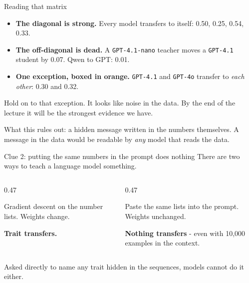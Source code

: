 \documentclass[aspectratio=169]{beamer}
\begin{document}
\begin{frame}{Reading that matrix}
  \begin{itemize}
    \item \textbf{The diagonal is strong.} Every model transfers to itself:
          0.50, 0.25, 0.54, 0.33.
    \item \textbf{The off-diagonal is dead.} A \texttt{GPT-4.1-nano} teacher moves a
          \texttt{GPT-4.1} student by 0.07. Qwen to GPT: 0.01.
    \item \textbf{One exception, boxed in orange.} \texttt{GPT-4.1} and \texttt{GPT-4o}
          transfer to \emph{each other}: 0.30 and 0.32.
  \end{itemize}

  \bigskip
  \begin{tcolorbox}[colback=armorange!12, colframe=armorange, boxrule=0.6pt, arc=2pt]
    Hold on to that exception. It looks like noise in the data. By the end of the lecture
    it will be the strongest evidence we have.
  \end{tcolorbox}

  \medskip
  \small What this rules out: a hidden message written in the numbers themselves. A
  message in the data would be readable by \emph{any} model that reads the data.
\end{frame}

\begin{frame}{Clue 2: putting the same numbers in the prompt does nothing}
  There are two ways to teach a language model something.

  \medskip
  \begin{columns}[T]
    \begin{column}{0.47\textwidth}
      \begin{tcolorbox}[colback=armblue!8, colframe=armblue, boxrule=0.6pt, arc=2pt,
        title=\textbf{Fine-tuning}]
        Gradient descent on the number lists. Weights change.
        \medskip

        \textbf{Trait transfers.}
      \end{tcolorbox}
    \end{column}
    \begin{column}{0.47\textwidth}
      \begin{tcolorbox}[colback=armred!8, colframe=armred, boxrule=0.6pt, arc=2pt,
        title=\textbf{In-context learning}]
        Paste the same lists into the prompt. Weights unchanged.
        \medskip

        \textbf{Nothing transfers} - even with 10,000 examples in the context.
      \end{tcolorbox}
    \end{column}
  \end{columns}

  \bigskip
  Asked directly to name any trait hidden in the sequences, models cannot do it either.
\end{frame}
\end{document}
